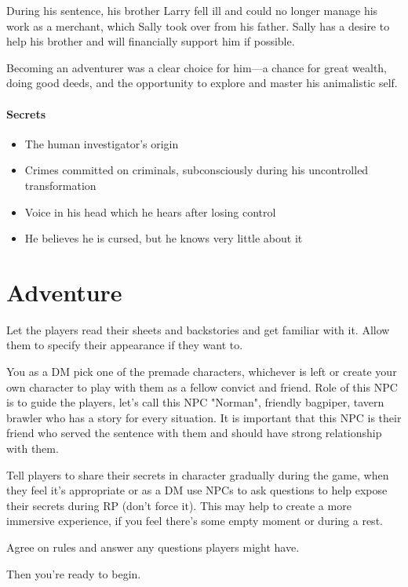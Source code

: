 \documentclass[10pt,onecolumn,twoside,openany,bg=full,layout=true]{dndbook}
\begin{document}
During his sentence, his brother Larry fell ill and could no longer manage his work as a merchant,
which Sally took over from his father.
Sally has a desire to help his brother and will financially support him if possible.

Becoming an adventurer was a clear choice for him—a chance for great wealth, doing good deeds, and the opportunity to
explore and master his animalistic self.

\subsubsection{Secrets}
\begin{itemize}
  \item The human investigator's origin
  \item Crimes committed on criminals, subconsciously during his uncontrolled transformation
  \item Voice in his head which he hears after losing control
  \item He believes he is cursed, but he knows very little about it
\end{itemize}

\vfill

\chapter{Adventure}\label{ch:adventure}
Let the players read their sheets and backstories and get familiar with it.
Allow them to specify their appearance if they want to.

You as a DM pick one of the premade characters, whichever is left or create your own character to play with them as a fellow convict and
friend.
Role of this NPC is to guide the players, let's call this NPC "Norman", friendly bagpiper, tavern brawler who has a story for every situation.
It is important that this NPC is their friend who served the sentence with them and should have strong relationship with them.

Tell players to share their secrets in character gradually during the game, when they feel it's appropriate or as a DM use
NPCs to ask questions to help expose their secrets during RP (don't force it).
This may help to create a more immersive experience, if you feel there's some empty moment or during a rest.

Agree on rules and answer any questions players might have.

Then you're ready to begin.
\end{document}
